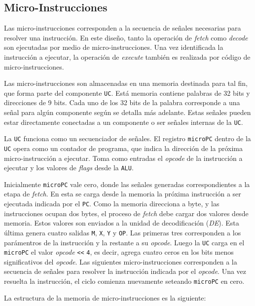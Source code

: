 \documentclass[a4paper,11pt]{article}
\begin{document}
\subsection*{Micro-Instrucciones}

Las micro-instrucciones corresponden a la secuencia de señales necesarias para resolver una instrucción.
En este diseño, tanto la operación de \emph{fetch} como \emph{decode} son ejecutadas por medio de micro-instrucciones.
Una vez identificada la instrucción a ejecutar, la operación de \emph{execute} también es realizada por código de micro-instrucciones.

Las micro-instrucciones son almacenadas en una memoria destinada para tal fin, que forma parte del componente \texttt{UC}.
Está memoria contiene palabras de 32 bits y direcciones de 9 bits.
Cada uno de los 32 bits de la palabra corresponde a una señal para algún componente según se detalla más adelante.
Estas señales pueden estar directamente conectadas a un componente o ser señales internas de la \texttt{UC}.

La \texttt{UC} funciona como un secuenciador de señales.
El registro \texttt{microPC} dentro de la \texttt{UC} opera como un contador de programa, que indica la dirección de la próxima micro-instrucción a ejecutar.
Toma como entradas el \emph{opcode} de la instrucción a ejecutar y los valores de \emph{flags} desde la \texttt{ALU}.

Inicialmente \texttt{microPC} vale cero, donde las señales generadas correspondientes a la etapa de \emph{fetch}.
En esta se carga desde la memoria la próxima instrucción a ser ejecutada indicada por el \texttt{PC}.
Como la memoria direcciona a byte, y las instrucciones ocupan dos bytes, el proceso de \emph{fetch} debe cargar dos valores desde memoria.
Estos valores son enviados a la unidad de decodificación (\emph{DE}).
Esta última genera cuatro salidas \texttt{M}, \texttt{X}, \texttt{Y} y \texttt{OP}.
Las primeras tres corresponden a los parámentros de la instrucción y la restante a su \emph{opcode}.
Luego la \texttt{UC} carga en el \texttt{microPC} el valor \emph{opcode} \verb|<<| \texttt{4}, es decir, agrega cuatro ceros en los bits menos significativos del \emph{opcode}.
Las siguientes micro-instrucciones corresponden a la secuencia de señales para resolver la instrucción indicada por el \emph{opcode}.
Una vez resuelta la instrucción, el ciclo comienza nuevamente seteando \texttt{microPC} en cero.

\bigskip

\noindent La estructura de la memoria de micro-instrucciones es la siguiente:
\end{document}
